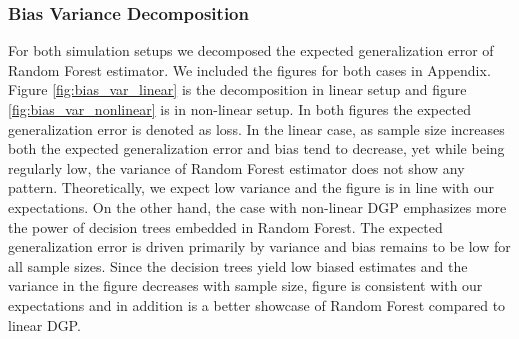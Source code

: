 \subsubsection{Bias Variance Decomposition}
For both simulation setups we decomposed the 
expected generalization error of 
Random Forest estimator. We included the figures for both 
cases in Appendix. 
Figure \ref{fig:bias_var_linear} is the decomposition in 
linear setup and 
figure \ref{fig:bias_var_nonlinear} is in non-linear setup. 
In both figures the expected generalization error 
is denoted as loss. 
In the linear case, as sample size increases both 
the expected generalization error and bias tend to decrease, 
yet while being regularly low, the variance of 
Random Forest estimator does not show any pattern. 
Theoretically, we expect low variance and 
the figure is in line with our expectations.
On the other hand, the case with non-linear DGP emphasizes 
more the power of decision trees embedded in Random Forest. 
The expected generalization error is driven primarily 
by variance and bias remains to be low for all sample sizes. 
Since the decision trees yield low biased estimates and 
the variance in the figure decreases with sample size, 
figure is consistent with our expectations and in addition is
a better showcase of Random Forest compared to linear DGP.